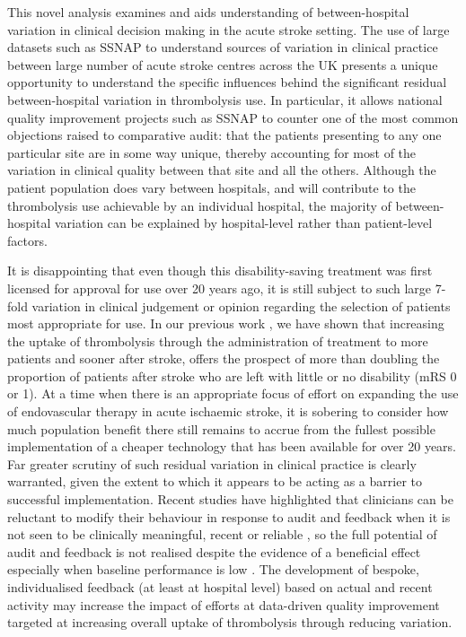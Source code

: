 This novel analysis examines and aids understanding of between-hospital variation in clinical decision making in the acute stroke setting. The use of large datasets such as SSNAP to understand sources of variation in clinical practice between large number of acute stroke centres across the UK presents a unique opportunity to understand the specific influences behind the significant residual between-hospital variation in thrombolysis use. In particular, it allows national quality improvement projects such as SSNAP to counter one of the most common objections raised to comparative audit: that the patients presenting to any one particular site are in some way unique, thereby accounting for most of the variation in clinical quality between that site and all the others. Although the patient population does vary between hospitals, and will contribute to the thrombolysis use achievable by an individual hospital, the majority of between-hospital variation can be explained by hospital-level rather than patient-level factors.

It is disappointing that even though this disability-saving treatment was first licensed for approval for use over 20 years ago, it is still subject to such large 7-fold variation in clinical judgement or opinion regarding the selection of patients most appropriate for use. In our previous work \cite{allen_using_2022}, we have shown that increasing the uptake of thrombolysis through the administration of treatment to more patients and sooner after stroke, offers the prospect of more than doubling the proportion of patients after stroke who are left with little or no disability (mRS 0 or 1). At a time when there is an appropriate focus of effort on expanding the use of endovascular therapy in acute ischaemic stroke, it is sobering to consider how much population benefit there still remains to accrue from the fullest possible implementation of a cheaper technology that has been available for over 20 years. Far greater scrutiny of such residual variation in clinical practice is clearly warranted, given the extent to which it appears to be acting as a barrier to successful implementation. Recent studies have highlighted that clinicians can be reluctant to modify their behaviour in response to audit and feedback when it is not seen to be clinically meaningful, recent or reliable \cite{bekker_give_2022}, so the full potential of audit and feedback is not realised \cite{foy_revitalising_2020} despite the evidence of a beneficial effect especially when baseline performance is low \cite{ivers_audit_2012}. The development of bespoke, individualised feedback (at least at hospital level) based on actual and recent activity may increase the impact of efforts at data-driven quality improvement targeted at increasing overall uptake of thrombolysis through reducing variation.

